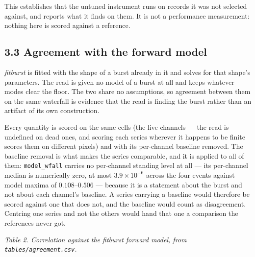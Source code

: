 \documentclass[10pt,letterpaper,twocolumn]{article}
\begin{document}
This establishes that the untuned instrument runs on records it was not selected against, and reports what it finds on them. It is not a performance measurement: nothing here is scored against a reference.

\subsection{3.3 Agreement with the forward model}\label{33-agreement-with-the-forward-model}

\emph{fitburst} is fitted with the shape of a burst already in it and solves for that shape's parameters. The read is given no model of a burst at all and keeps whatever modes clear the floor. The two share no assumptions, so agreement between them on the same waterfall is evidence that the read is finding the burst rather than an artifact of its own construction.

Every quantity is scored on the same cells (the live channels --- the read is undefined on dead ones, and scoring each series wherever it happens to be finite scores them on different pixels) and with its per-channel baseline removed. The baseline removal is what makes the series comparable, and it is applied to all of them: \texttt{model\_\allowbreak{}wfall} carries no per-channel standing level at all --- its per-channel median is numerically zero, at most \(3.9\times10^{-6}\) across the four events against model maxima of \(0.108\)--\(0.506\) --- because it is a statement about the burst and not about each channel's baseline. A series carrying a baseline would therefore be scored against one that does not, and the baseline would count as disagreement. Centring one series and not the others would hand that one a comparison the references never got.


\emph{Table 2. Correlation against the fitburst forward model, from \texttt{tables/\allowbreak{}agreement.\allowbreak{}csv}.}
\end{document}

